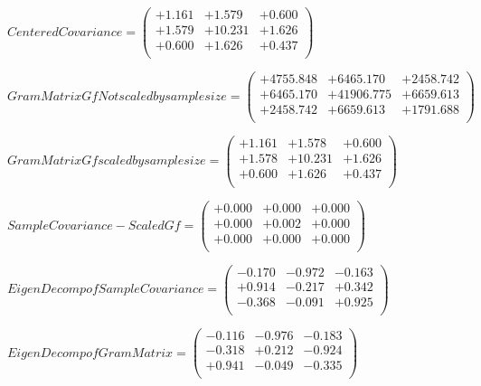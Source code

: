 \documentclass[9pt]{article}
\theoremstyle{plain}
\theoremstyle{definition}
\theoremstyle{remark}
\numberwithin{equation}{section}
\begin{document}
$Centered Covariance = \left(
\begin{array}{
ccc}
+1.161 & +1.579 & +0.600 \\
+1.579 & +10.231 & +1.626 \\
+0.600 & +1.626 & +0.437 \\
\end{array}
\right)$ \newline 

$Gram Matrix Gf Not scaled by sample size = \left(
\begin{array}{
ccc}
+4755.848 & +6465.170 & +2458.742 \\
+6465.170 & +41906.775 & +6659.613 \\
+2458.742 & +6659.613 & +1791.688 \\
\end{array}
\right)$ \newline 

$Gram Matrix Gf  scaled by sample size = \left(
\begin{array}{
ccc}
+1.161 & +1.578 & +0.600 \\
+1.578 & +10.231 & +1.626 \\
+0.600 & +1.626 & +0.437 \\
\end{array}
\right)$ \newline 

$SampleCovariance - Scaled Gf = \left(
\begin{array}{
ccc}
+0.000 & +0.000 & +0.000 \\
+0.000 & +0.002 & +0.000 \\
+0.000 & +0.000 & +0.000 \\
\end{array}
\right)$ \newline 

$EigenDecomp of SampleCovariance = \left(
\begin{array}{
ccc}
-0.170 & -0.972 & -0.163 \\
+0.914 & -0.217 & +0.342 \\
-0.368 & -0.091 & +0.925 \\
\end{array}
\right)$ \newline 

$EigenDecomp of Gram Matrix = \left(
\begin{array}{
ccc}
-0.116 & -0.976 & -0.183 \\
-0.318 & +0.212 & -0.924 \\
+0.941 & -0.049 & -0.335 \\
\end{array}
\right)$ \newline 
\end{document}
